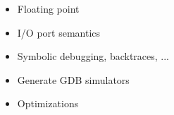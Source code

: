 \begin{block}{\large {}\vphantom{Future Work} }
    \begin{itemize}
        \item Floating point        \\
        \item I/O port semantics    \\
        \item Symbolic debugging, backtraces, ... \\
        \item Generate GDB simulators \\
        \item Optimizations \\
    \end{itemize}
\end{block}
